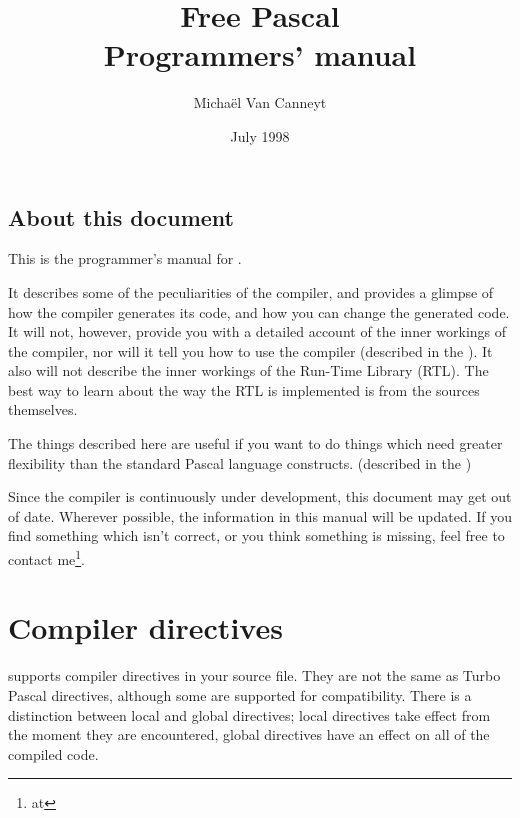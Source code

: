 \documentclass{report}
\begin{document}
\title{Free Pascal \\ Programmers' manual}
\date{July 1998}
\author{Micha\"el Van Canneyt}
\maketitle
\tableofcontents
\newpage

\section*{About this document}
This is the programmer's manual for \fpc.

It describes some of the peculiarities of the \fpc compiler, and provides a
glimpse of how the compiler generates its code, and how you can change the
generated code. It will not, however, provide you with a detailed account of
the inner workings of the compiler, nor will it tell you how to use the
compiler (described in the \userref). It also will not describe the inner
workings of the Run-Time Library (RTL). The best way to learn about the way
the RTL is implemented is from the sources themselves.

The things described here are useful if you want to do things which need
greater flexibility than the standard Pascal language constructs.
(described in the )

Since the compiler is continuously under development, this document may get
out of date. Wherever possible, the information in this manual will be
updated. If you find something which isn't correct, or you think something
 is missing, feel free to contact me\footnote{at
}.

\chapter{Compiler directives}
\label{ch:CompSwitch}
\fpc supports compiler directives in your source file. They are not the same
as Turbo Pascal directives, although some are supported for compatibility.
There is a distinction between local and global directives; local directives
take effect from the moment they are encountered, global directives have an
effect on all of the compiled code.
\end{document}
